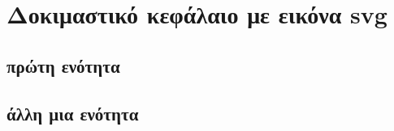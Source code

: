 \section{Δοκιμαστικό κεφάλαιο με εικόνα svg}
\subsection{πρώτη ενότητα}
\lipsum[1-2]
\subsection{άλλη μια ενότητα}
\lipsum[3-4]